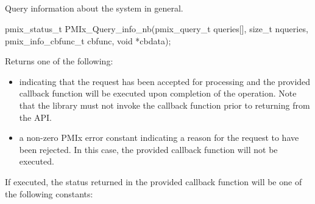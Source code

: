 \subsection{}

\summary

Query information about the system in general.

\format

\cspecificstart
\begin{codepar}
pmix_status_t
PMIx_Query_info_nb(pmix_query_t queries[], size_t nqueries,
                   pmix_info_cbfunc_t cbfunc, void *cbdata);
\end{codepar}
\cspecificend

\begin{arglist}
\end{arglist}

Returns one of the following:

\begin{itemize}
\item {} indicating that the request has been accepted for processing and the provided callback function will be executed upon completion of the operation. Note that the library must not invoke the callback function prior to returning from the \ac{API}.
\item a non-zero \ac{PMIx} error constant indicating a reason for the request to have been rejected. In this case, the provided callback function will not be executed.
\end{itemize}

If executed, the status returned in the provided callback function will be one of the following constants:

